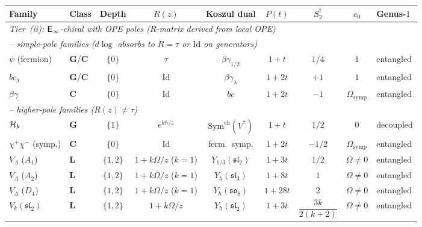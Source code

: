 \begin{computation}
\begin{center}
\small
\renewcommand{\arraystretch}{1.5}
\setlength{\tabcolsep}{4pt}
\begin{tabular}{llccccccl}
\toprule
\textbf{Family}
 & \textbf{Class}
 & \textbf{Depth}
 & $R(z)$
 & \textbf{Koszul dual}
 & $P(t)$
 & $S_2^\dagger$
 & $c_0$
 & \textbf{Genus-$1$} \\
\midrule
\multicolumn{9}{l}{\textit{Tier~\textup{(ii)}: $\mathsf{E}_{\infty}$-chiral with
 OPE poles \textup{(}$R$-matrix derived from local OPE\textup{)}}} \\[2pt]
\multicolumn{9}{l}{\quad\textit{-- simple-pole families
 \textup{(}$d\log$ absorbs to $R = \tau$ or $\mathrm{Id}$
 on generators\textup{)}}} \\[2pt]
$\psi$ (fermion)
 & $\mathbf{G}$/$\mathbf{C}$
 & $\{0\}$
 & $\tau$
 & $\beta\gamma_{1/2}$
 & $1{+}t$
 & $1/4$
 & $1$
 & entangled \\[3pt]
$bc_\lambda$
 & $\mathbf{G}$/$\mathbf{C}$
 & $\{0\}$
 & $\mathrm{Id}$
 & $\beta\gamma_\lambda$
 & $1{+}2t$
 & $+1$
 & $1$
 & entangled \\[3pt]
$\beta\gamma$
 & $\mathbf{C}$
 & $\{0\}$
 & $\mathrm{Id}$
 & $bc$
 & $1{+}2t$
 & $-1$
 & $\Omega_{\mathrm{symp}}$
 & entangled \\[3pt]
\multicolumn{9}{l}{\quad\textit{-- higher-pole families
 \textup{(}$R(z) \ne \tau$\textup{)}}} \\[2pt]
$\mathcal{H}_k$
 & $\mathbf{G}$
 & $\{1\}$
 & $e^{k\hbar/z}$
 & $\mathrm{Sym}^{\mathrm{ch}}(V^*)$
 & $1{+}t$
 & $1/2$
 & $0$
 & decoupled \\[3pt]
$\chi^+\chi^-$ (symp.)
 & $\mathbf{C}$
 & $\{0\}$
 & $\mathrm{Id}$
 & ferm.\ symp.
 & $1{+}2t$
 & $-1/2$
 & $\Omega_{\mathrm{symp}}$
 & entangled \\[3pt]
$V_\Lambda$ ($A_1$)
 & $\mathbf{L}$
 & $\{1,2\}$
 & $1{+}k\Omega/z$ ($k{=}1$)
 & $Y_{1/3}(\mathfrak{sl}_2)$
 & $1{+}3t$
 & $1/2$
 & $\Omega\ne 0$
 & entangled \\[3pt]
$V_\Lambda$ ($A_2$)
 & $\mathbf{L}$
 & $\{1,2\}$
 & $1{+}k\Omega/z$ ($k{=}1$)
 & $Y_\hbar(\mathfrak{sl}_3)$
 & $1{+}8t$
 & $1$
 & $\Omega\ne 0$
 & entangled \\[3pt]
$V_\Lambda$ ($D_4$)
 & $\mathbf{L}$
 & $\{1,2\}$
 & $1{+}k\Omega/z$ ($k{=}1$)
 & $Y_\hbar(\mathfrak{so}_8)$
 & $1{+}28t$
 & $2$
 & $\Omega\ne 0$
 & entangled \\[3pt]
$V_k(\mathfrak{sl}_2)$
 & $\mathbf{L}$
 & $\{1,2\}$
 & $1{+}k\Omega/z$
 & $Y_\hbar(\mathfrak{sl}_2)$
 & $1{+}3t$
 & $\dfrac{3k}{2(k{+}2)}$
 & $\Omega\ne 0$
 & entangled \\[5pt]

\end{tabular}
\end{center}
\end{computation}
